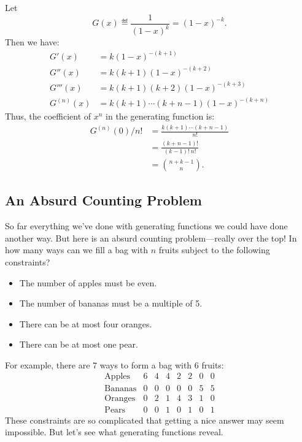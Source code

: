 \begin{editingnotes}
Let
%
\[
G(x) \eqdef \frac{1}{(1-x)^k} = (1-x)^{-k}.
\]
%
Then we have:
%
\begin{align*}
G'(x) & = k (1-x)^{-(k+1)} \\
G''(x) & = k (k+1) (1-x)^{-(k+2)} \\
G'''(x) & = k (k+1) (k+2) (1-x)^{-(k+3)} \\
G^{(n)}(x) & = k (k+1) \cdots (k + n - 1)(1-x)^{-(k+n)}
\end{align*}
%
Thus, the coefficient of $x^n$ in the generating function is:
%
\begin{align*}
G^{(n)}(0) / n! & = \frac{k (k+1) \cdots (k + n - 1)}{n!} \\
                & = \frac{(k + n - 1)!}{(k - 1)! \ n!} \\
                & = \binom{n + k - 1}{n}.
\end{align*}

\end{editingnotes}

\subsection{An Absurd Counting Problem}
\label{sec:impossible_counting}

So far everything we've done with generating functions we could have
done another way.  But here is an absurd counting problem---really
over the top!  In how many ways can we fill a bag with $n$ fruits
subject to the following constraints?

\begin{itemize}
\item The number of apples must be even.
\item The number of bananas must be a multiple of 5.
\item There can be at most four oranges.
\item There can be at most one pear.
\end{itemize}

For example, there are 7 ways to form a bag with 6 fruits:
%
\[
\begin{array}{c|ccccccc}
\text{Apples}  & 6 & 4 & 4 & 2 & 2 & 0 & 0 \\
\text{Bananas} & 0 & 0 & 0 & 0 & 0 & 5 & 5 \\
\text{Oranges} & 0 & 2 & 1 & 4 & 3 & 1 & 0 \\
\text{Pears}   & 0 & 0 & 1 & 0 & 1 & 0 & 1
\end{array}
\]
These constraints are so complicated that getting a nice answer may
seem impossible.  But let's see what generating functions reveal.

